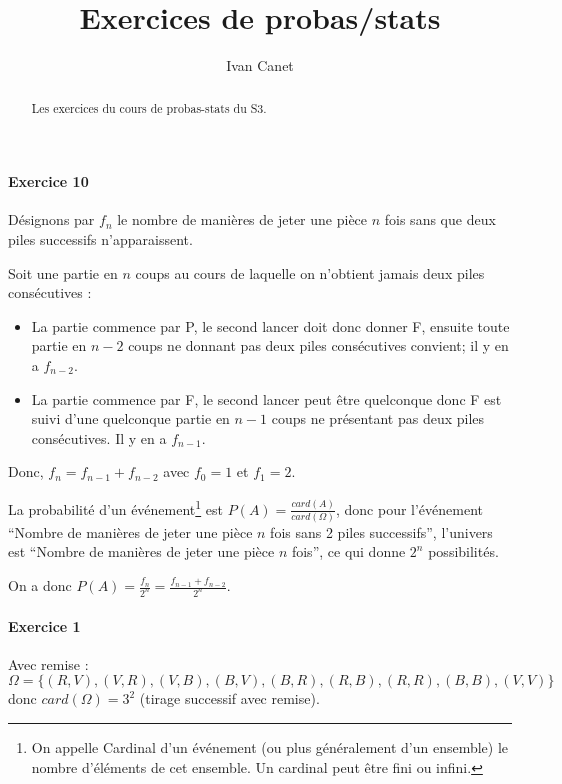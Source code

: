 \documentclass[10pt,a4paper,french]{article}
\begin{document}
\title{Exercices de probas/stats}
\author{Ivan Canet}
\maketitle

\begin{abstract} %
Les exercices du cours de probas-stats du S3.
\end{abstract}

\tableofcontents

\paragraph{Exercice 10}
Désignons par $f_n$ le nombre de manières de jeter une pièce $n$ fois sans que deux piles successifs n'apparaissent.

Soit une partie en $n$ coups au cours de laquelle on n'obtient jamais deux piles consécutives :
\begin{itemize}
\item La partie commence par P, le second lancer doit donc donner F, ensuite toute partie en $n-2$ coups ne donnant pas deux piles consécutives convient; il y en a $f_{n-2}$.
\item La partie commence par F, le second lancer peut être quelconque donc F est suivi d'une quelconque partie en $n-1$ coups ne présentant pas deux piles consécutives. Il y en a $f_{n-1}$.
\end{itemize}

Donc, $f_n = f_{n-1} + f_{n-2}$ avec $f_0 = 1$ et $f_1=2$.

La probabilité d'un événement\footnote{On appelle Cardinal d'un événement (ou plus généralement d'un ensemble) le nombre d'éléments de cet ensemble. Un cardinal peut être fini ou infini.} est $P(A)=\frac{card(A)}{card(\Omega)}$, donc pour l'événement ``Nombre de manières de jeter une pièce $n$ fois sans 2 piles successifs'', l'univers est ``Nombre de manières de jeter une pièce $n$ fois'', ce qui donne $2^n$ possibilités.

On a donc $P(A)=\frac{f_n}{2^n}=\frac{f_{n-1}+f_{n-2}}{2^n}$.

\paragraph{Exercice 1}
Avec remise : $\Omega=\lbrace(R, V), (V, R), (V, B), (B, V), (B, R), (R, B), (R, R), (B, B), (V, V)\rbrace$ donc $card(\Omega)=3^2$ (tirage successif avec remise).
\end{document}
